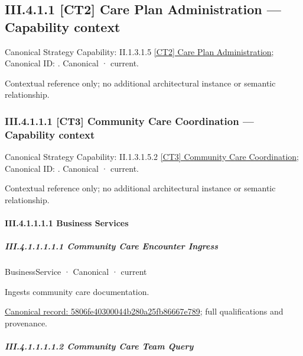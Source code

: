 \subsection*{III.4.1.1 [CT2] Care Plan Administration — Capability context}
\label{navigation:III.4.1.1}

{\small Canonical Strategy Capability: II.1.3.1.5 \hyperref[element:cf06eec5699f406fa30a00d2f76e3098]{[CT2] Care Plan Administration}; Canonical ID: \texttt{}. Canonical · current.}\par
Contextual reference only; no additional architectural instance or semantic relationship.\par
\subsubsection*{III.4.1.1.1 [CT3] Community Care Coordination — Capability context}
\label{navigation:III.4.1.1.1}

{\small Canonical Strategy Capability: II.1.3.1.5.2 \hyperref[element:8c8c6266d9ed43e09dbe44fcdd669132]{[CT3] Community Care Coordination}; Canonical ID: \texttt{}. Canonical · current.}\par
Contextual reference only; no additional architectural instance or semantic relationship.\par
\paragraph*{III.4.1.1.1.1 Business Services}
\label{navigation:III.4.1.1.1.1}

\subparagraph*{III.4.1.1.1.1.1 Community Care Encounter Ingress}
\label{navigation:III.4.1.1.1.1.1}

\label{element:5806fe40300044b280a25fb86667e789}
{\small BusinessService · Canonical · current}\par

Ingests community care documentation.


{\footnotesize \href{../../../../continuum/business/business-service/5806fe40300044b280a25fb86667e789.md}{Canonical record: 5806fe40300044b280a25fb86667e789}; full qualifications and provenance.}\par
\subparagraph*{III.4.1.1.1.1.2 Community Care Team Query}
\label{navigation:III.4.1.1.1.1.2}

